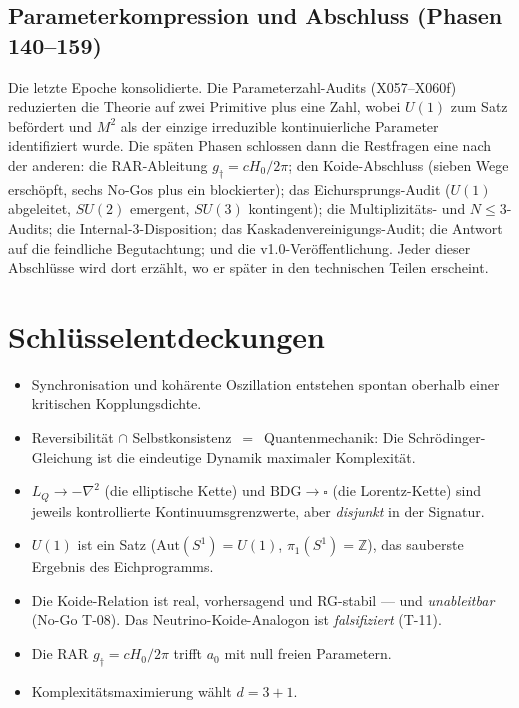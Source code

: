 \documentclass[10pt,twoside,openany]{book}
\begin{document}
\subsection{Parameterkompression und Abschluss (Phasen 140--159)}

Die letzte Epoche konsolidierte. Die Parameterzahl-Audits (X057--X060f) reduzierten die
Theorie auf zwei Primitive plus eine Zahl, wobei $U(1)$ zum Satz befördert und $M^2$ als
der einzige irreduzible kontinuierliche Parameter identifiziert wurde. Die späten Phasen
schlossen dann die Restfragen eine nach der anderen: die RAR-Ableitung $g_\dagger=cH_0/2\pi$;
den Koide-Abschluss (sieben Wege erschöpft, sechs No-Gos plus ein blockierter); das
Eichursprungs-Audit ($U(1)$ abgeleitet, $SU(2)$ emergent, $SU(3)$ kontingent); die
Multiplizitäts- und $N\le3$-Audits; die Internal-3-Disposition; das
Kaskadenvereinigungs-Audit; die Antwort auf die feindliche Begutachtung; und die
v1.0-Veröffentlichung. Jeder dieser Abschlüsse wird dort erzählt, wo er später in den
technischen Teilen erscheint.

\section{Schlüsselentdeckungen}

\begin{itemize}
\item Synchronisation und kohärente Oszillation entstehen spontan oberhalb einer
kritischen Kopplungsdichte.
\item Reversibilität $\cap$ Selbstkonsistenz $\,=\,$ Quantenmechanik: Die
Schr\"odinger-Gleichung ist die eindeutige Dynamik maximaler Komplexität.
\item $L_Q\to-\nabla^2$ (die elliptische Kette) und $\mathrm{BDG}\to\square$ (die
Lorentz-Kette) sind jeweils kontrollierte Kontinuumsgrenzwerte, aber \emph{disjunkt} in
der Signatur.
\item $U(1)$ ist ein Satz ($\mathrm{Aut}(S^1)=U(1)$, $\pi_1(S^1)=\mathbb Z$), das
sauberste Ergebnis des Eichprogramms.
\item Die Koide-Relation ist real, vorhersagend und RG-stabil --- und \emph{unableitbar}
(No-Go T-08). Das Neutrino-Koide-Analogon ist \emph{falsifiziert} (T-11).
\item Die RAR $g_\dagger=cH_0/2\pi$ trifft $a_0$ mit null freien Parametern.
\item Komplexitätsmaximierung wählt $d=3{+}1$.
\end{itemize}
\end{document}
